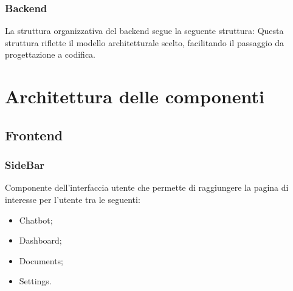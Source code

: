 \documentclass[10pt, a4paper]{article}
\begin{document}
\subsubsection{Backend}
La struttura organizzativa del backend segue la seguente struttura:
Questa struttura riflette il modello architetturale scelto, facilitando il passaggio da progettazione a codifica.


\newpage
\section{Architettura delle componenti} %
\subsection{Frontend}


\begin{comment}
RF.D.56 richiesta non pertinente->risposta cortese blueprint? configurazione?

\end{comment}

\subsubsection{SideBar}
Componente dell'interfaccia utente che permette di raggiungere la pagina di interesse per l'utente tra le seguenti:\\
\begin{itemize}
    \item Chatbot;
    \item Dashboard;
    \item Documents;
    \item Settings.
\end{itemize}
\end{document}
